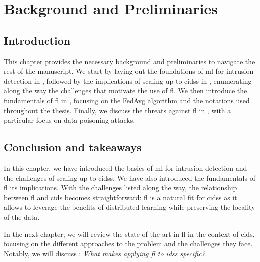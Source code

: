 \chapter{Background and Preliminaries\label{chap:background}}
\localtoc


\section{Introduction\label{sec:bg.intro}}

This chapter provides the necessary background and preliminaries to navigate the rest of the manuscript. 
We start by laying out the foundations of \gls{ml} for intrusion detection in , followed by the implications of scaling up to \glspl{cids} in , enumerating along the way the challenges that motivate the use of \gls{fl}.
We then introduce the fundamentals of \gls{fl} in , focusing on the FedAvg algorithm and the notations used throughout the thesis.
Finally, we discuss the threats against \gls{fl} in , with a particular focus on data poisoning attacks.






\section{Conclusion and takeaways\label{sec:bg.conclusion}}

In this chapter, we have introduced the basics of \gls{ml} for intrusion detection and the challenges of scaling up to \glspl{cids}.
We have also introduced the fundamentals of \gls{fl} its implications.
With the challenges listed along the way, the relationship between \gls{fl} and \gls{cids} becomes straightforward: \gls{fl} is a natural fit for \glspl{cids} as it allows to leverage the benefits of distributed learning while preserving the locality of the data.

In the next chapter, we will review the state of the art in \gls{fl} in the context of \gls{cids}, focusing on the different approaches to the problem and the challenges they face.
Notably, we will discuss : \emph{What makes applying \gls{fl} to \glspl{ids} specific?}.





